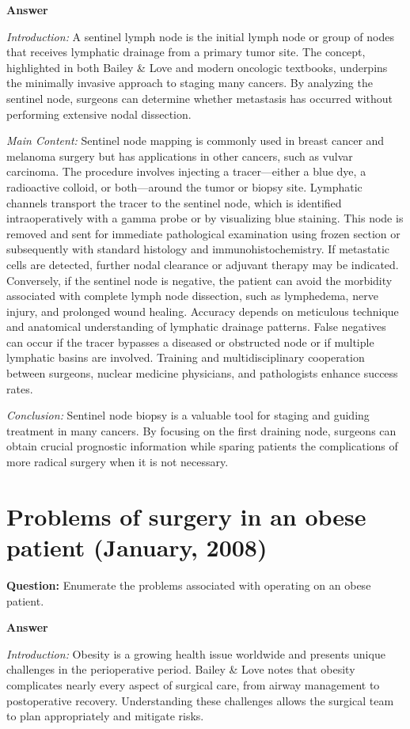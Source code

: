 \documentclass{article}
\begin{document}
\textbf{Answer}

\emph{Introduction:} A sentinel lymph node is the initial lymph node or group of nodes that receives lymphatic drainage from a primary tumor site. The concept, highlighted in both Bailey \& Love and modern oncologic textbooks, underpins the minimally invasive approach to staging many cancers. By analyzing the sentinel node, surgeons can determine whether metastasis has occurred without performing extensive nodal dissection.

\emph{Main Content:} Sentinel node mapping is commonly used in breast cancer and melanoma surgery but has applications in other cancers, such as vulvar carcinoma. The procedure involves injecting a tracer—either a blue dye, a radioactive colloid, or both—around the tumor or biopsy site. Lymphatic channels transport the tracer to the sentinel node, which is identified intraoperatively with a gamma probe or by visualizing blue staining. This node is removed and sent for immediate pathological examination using frozen section or subsequently with standard histology and immunohistochemistry. If metastatic cells are detected, further nodal clearance or adjuvant therapy may be indicated. Conversely, if the sentinel node is negative, the patient can avoid the morbidity associated with complete lymph node dissection, such as lymphedema, nerve injury, and prolonged wound healing. Accuracy depends on meticulous technique and anatomical understanding of lymphatic drainage patterns. False negatives can occur if the tracer bypasses a diseased or obstructed node or if multiple lymphatic basins are involved. Training and multidisciplinary cooperation between surgeons, nuclear medicine physicians, and pathologists enhance success rates.

\emph{Conclusion:} Sentinel node biopsy is a valuable tool for staging and guiding treatment in many cancers. By focusing on the first draining node, surgeons can obtain crucial prognostic information while sparing patients the complications of more radical surgery when it is not necessary.


\section{Problems of surgery in an obese patient (January, 2008)}


\textbf{Question:} Enumerate the problems associated with operating on an obese patient.

\textbf{Answer}

\emph{Introduction:} Obesity is a growing health issue worldwide and presents unique challenges in the perioperative period. Bailey \& Love notes that obesity complicates nearly every aspect of surgical care, from airway management to postoperative recovery. Understanding these challenges allows the surgical team to plan appropriately and mitigate risks.
\end{document}
